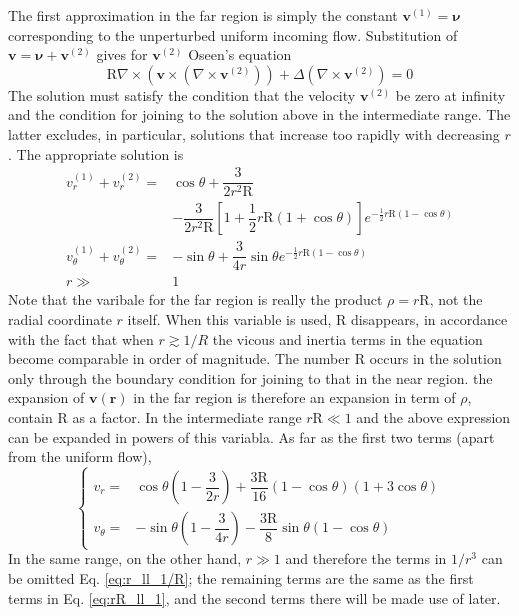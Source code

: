 \documentclass[conference]{IEEEtran}
\theoremstyle{definition}
\theoremstyle{remark}
\begin{document}
    The first approximation in the far region is simply the constant $\mathbf{v}^{(1)} = \boldsymbol{\nu}$ corresponding to the unperturbed uniform incoming flow. Substitution of $\mathbf{v} = \boldsymbol{\nu} + \mathbf{v}^{(2)}$ gives for $\mathbf{v}^{(2)}$ Oseen's equation
    \begin{equation}
        \mathrm{R} \nabla \times (\mathbf{v} \times (\nabla \times \mathbf{v}^{(2)})) + \Delta (\nabla \times \mathbf{v}^{(2)}) = 0
    \end{equation}
    The solution must satisfy the condition that the velocity $\mathbf{v}^{(2)}$ be zero at infinity and the condition for joining to the solution above in the intermediate range. The latter excludes, in particular, solutions that increase too rapidly with decreasing $r$. The appropriate solution is
    \begin{align}
        v_r^{(1)} + v_r^{(2)} =& \cos \theta +\dfrac3{2r^2 \mathrm{R}} \nonumber \\
        &- \dfrac3{2r^2 \mathrm{R}}\left[1 + \dfrac12 r \mathrm{R}(1 + \cos \theta) \right]e^{-\frac12 r \mathrm{R} (1 - \cos \theta)} \nonumber \\
        v_\theta^{(1)} + v_\theta^{(2)} =& -\sin \theta + \dfrac3{4r} \sin 
        \theta e^{-\frac12r\mathrm{R}(1 - \cos\theta)} \nonumber \\
        r \gg& 1
    \end{align}
    Note that the varibale for the far region is really the product $\rho = r \mathrm{R}$, not the radial coordinate $r$ itself. When this variable is used, $\mathrm{R}$ disappears, in accordance with the fact that when $r \gtrsim 1/R$ the vicous and inertia terms in the equation become comparable in order of magnitude. The number $\mathrm{R}$ occurs in the solution only through the boundary condition for joining to that in the near region. the expansion of $\mathbf{v}(\mathbf{r})$ in the far region is therefore an expansion in term of $\rho$, contain $\mathrm{R}$ as a factor. In the intermediate range $r\mathrm{R} \ll 1$ and the above expression can be expanded in powers of this variabla. As far as the first two terms (apart from the uniform flow),
    \begin{equation}
        \left\{
            \begin{aligned}
                v_r =& \cos \theta \left( 1 - \dfrac{3}{2r} \right) + \dfrac{3\mathrm{R}}{16}(1 - \cos \theta)(1 + 3\cos \theta) \\
                v_\theta =& -\sin \theta \left( 1 - \dfrac3{4r} \right) - \dfrac{3\mathrm{R}}8 \sin\theta (1 - \cos \theta)
            \end{aligned}
        \right.
        \label{eq:rR_ll_1}
    \end{equation}
    In the same range, on the other hand, $r \gg 1$ and therefore the terms in $1/r^3$ can be omitted Eq. \ref{eq:r_ll_1/R}; the remaining terms are the same as the first terms in Eq. \ref{eq:rR_ll_1}, and the second terms there will be made use of later.
\end{document}
